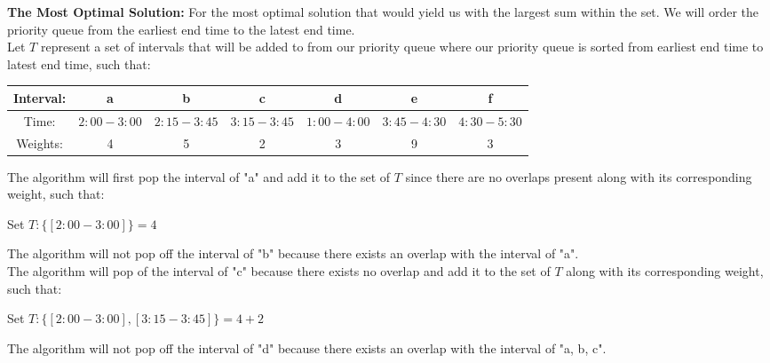 \documentclass[11pt]{article}
\theoremstyle{definition}
\theoremstyle{definition}
\theoremstyle{definition}
\begin{document}
\textbf{The  Most Optimal Solution:}
For the most optimal solution that would yield us with the largest sum within the set. We will order the priority queue from the earliest end time to the latest end time. \\

Let $T$ represent a set of intervals that will be added to from our priority queue where our priority queue is sorted from earliest end time to latest end time, such that: \\
\begin{center}
\begin{tabular}{ | c | c | c | c | c | c | c | }
 \hline
 Interval:& a & b & c & d & e & f\\  
 \hline
 Time: & $2:00 - 3:00$ & $2:15 - 3:45$ & $3:15 - 3:45$ & $1:00 - 4:00$  & $3:45 - 4:30$ & $4:30 - 5:30$\\
  \hline
  Weights: & 4 & 5 & 2 & 3 & 9 & 3 \\
  \hline
\end{tabular}
\end{center}

The algorithm will first pop the interval of "a" and add it to the set of $T$ since there are no overlaps present along with its corresponding weight, such that: \\
\begin{center}
Set $T: \{[2:00 - 3:00]\} = 4$\\
\end{center}

The algorithm will not pop off the interval of "b" because there exists an overlap with the interval of "a". \\

The algorithm will pop of the interval of "c" because there exists no overlap and add it to the set of $T$ along with its corresponding weight, such that: \\
\begin{center}
Set $T: \{[2:00 - 3:00], [3:15 - 3:45]\} = 4 + 2$\\
\end{center}

The algorithm will not pop off the interval of "d" because there exists an overlap with the interval of "a, b, c". \\
\end{document}
